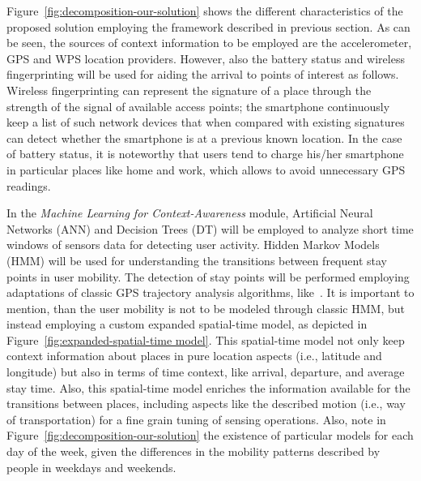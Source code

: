 \documentclass[ENG,PhD]{cinvestav}
\begin{document}
Figure~\ref{fig:decomposition-our-solution} shows the different characteristics of the proposed solution employing the framework described in previous section.
As can be seen, the sources of context information to be employed are the accelerometer, GPS and WPS location providers.
However, also the battery status and wireless fingerprinting will be used for aiding the arrival to points of interest as follows.
Wireless fingerprinting can represent the signature of a place through the strength of the signal of available access points; the smartphone continuously keep a list of such network devices that when compared with existing signatures can detect whether the smartphone is at a previous known location.
In the case of battery status, it is noteworthy that users tend to charge his/her smartphone in particular places like home and work, which allows to avoid unnecessary GPS readings.

In the \emph{Machine Learning for Context-Awareness} module, Artificial Neural Networks (ANN) and Decision Trees (DT) will be employed to analyze short time windows of sensors data for detecting user activity.
Hidden Markov Models (HMM) will be used for understanding the transitions between frequent stay points in user mobility.
The detection of stay points will be performed employing adaptations of classic GPS trajectory analysis algorithms, like~\cite{Montoliu2010}.
It is important to mention, than the user mobility is not to be modeled through classic HMM, but instead employing a custom expanded spatial-time model, as depicted in Figure~\ref{fig:expanded-spatial-time model}.
This spatial-time model not only keep context information about places in pure location aspects (i.e., latitude and longitude) but also in terms of time context, like arrival, departure, and average stay time.
Also, this spatial-time model enriches the information available for the transitions between places, including aspects like the described motion (i.e., way of transportation) for a fine grain tuning of sensing operations.
Also, note in Figure~\ref{fig:decomposition-our-solution} the existence of particular models for each day of the week, given the differences in the mobility patterns described by people in weekdays and weekends.
\end{document}
